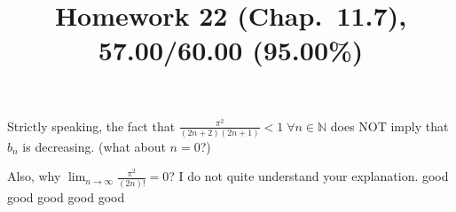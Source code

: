 \documentclass[10pt]{article} %
\title{Homework 22 (Chap.~11.7),
57.00/60.00 (95.00\%)
}
\begin{document}
\maketitle
{}
Strictly speaking, the fact that $\frac{\pi^2}{(2n+2)(2n+1)}<1\;\forall n\in\mathbb{N}$ does NOT imply that $b_n$ is decreasing.
(what about $n=0$?)

Also, why $\lim_{n\to\infty}\frac{\pi^2}{(2n)!}=0$? I do not quite understand your explanation.
good
good
good
good
good
\end{document}
